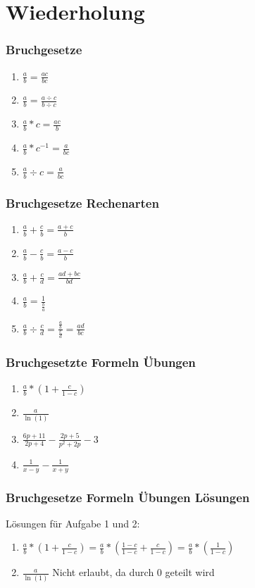 \section{Wiederholung}
\begin{frame}
    \frametitle{Bruchgesetze}
    \begin{enumerate}
        \vfill \item $\frac{a}{b}=\frac{ac}{bc}$
        \vfill \item $\frac{a}{b}=\frac{a \div c}{b \div c}$
        \vfill \item $\frac{a}{b}*c=\frac{ac}{b}$
        \vfill \item $\frac{a}{b}*c^{-1}=\frac{a}{bc}$
        \vfill \item $\frac{a}{b} \div c=\frac{a}{bc}$
    \end{enumerate}
\end{frame}

\begin{frame}
    \frametitle{Bruchgesetze Rechenarten}
    \begin{enumerate}
        \vfill \item $\frac{a}{b} + \frac{c}{b}=\frac{a+c}{b}$
        \vfill \item $\frac{a}{b} - \frac{c}{b}=\frac{a-c}{b}$
        \vfill \item $\frac{a}{b} + \frac{c}{d}=\frac{ad+bc}{bd}$
        \vfill \item $\frac{a}{b} = \frac{1}{\frac{b}{a}}$
        \vfill \item $\frac{a}{b} \div \frac{c}{d} = \frac{\frac{a}{b}}{\frac{c}{d}} = \frac{ad}{bc}$
    \end{enumerate}
\end{frame}


\begin{frame}
    \frametitle{Bruchgesetzte Formeln Übungen}
    \begin{enumerate}
	\vfill \item $\frac{a}{b} * (1 + \frac{c}{1-c})$
        \vfill \item $\frac{a}{\ln(1)}$
        \vfill \item $\frac{6p + 11}{2p + 4} - \frac{2p + 5}{p^2 +2p} -3$
	   \vfill \item $\frac{1}{x - y} - \frac{1}{x + y} $
    \end{enumerate}
\end{frame}

\begin{frame}
    \frametitle{Bruchgesetze Formeln Übungen Lösungen}
	Lösungen für Aufgabe 1 und 2:
    \begin{enumerate}
	\vfill \item $\frac{a}{b} * (1 + \frac{c}{1-c}) = \frac{a}{b}*(\frac{1-c}{1-c}+\frac{c}{1-c}) = \frac{a}{b}*(\frac{1}{1-c})$
        \vfill \item $\frac{a}{\ln(1)}$ Nicht erlaubt, da durch 0 geteilt wird
    \end{enumerate}
\end{frame}

